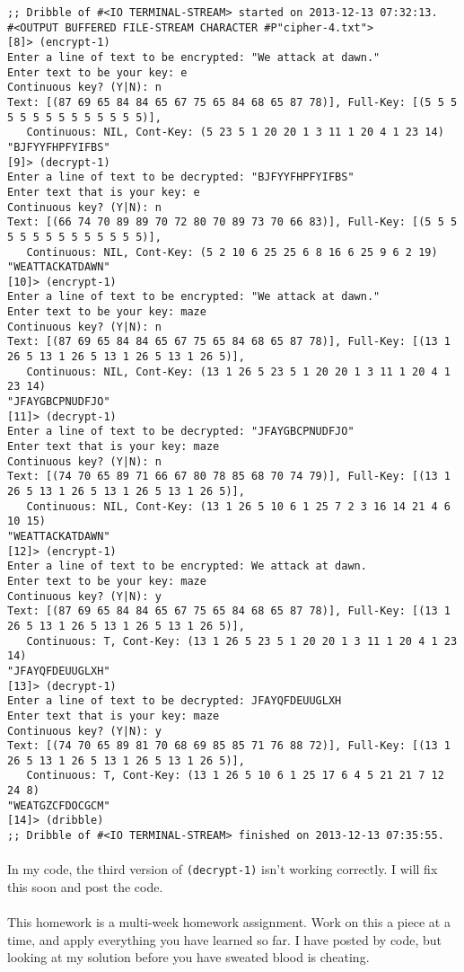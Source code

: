 \documentclass{article}
\begin{document}
\begin{verbatim}
;; Dribble of #<IO TERMINAL-STREAM> started on 2013-12-13 07:32:13.
#<OUTPUT BUFFERED FILE-STREAM CHARACTER #P"cipher-4.txt">
[8]> (encrypt-1)
Enter a line of text to be encrypted: "We attack at dawn."
Enter text to be your key: e
Continuous key? (Y|N): n
Text: [(87 69 65 84 84 65 67 75 65 84 68 65 87 78)], Full-Key: [(5 5 5 5 5 5 5 5 5 5 5 5 5 5)],
   Continuous: NIL, Cont-Key: (5 23 5 1 20 20 1 3 11 1 20 4 1 23 14)
"BJFYYFHPFYIFBS"
[9]> (decrypt-1)
Enter a line of text to be decrypted: "BJFYYFHPFYIFBS"
Enter text that is your key: e
Continuous key? (Y|N): n
Text: [(66 74 70 89 89 70 72 80 70 89 73 70 66 83)], Full-Key: [(5 5 5 5 5 5 5 5 5 5 5 5 5 5)],
   Continuous: NIL, Cont-Key: (5 2 10 6 25 25 6 8 16 6 25 9 6 2 19)
"WEATTACKATDAWN"
[10]> (encrypt-1)
Enter a line of text to be encrypted: "We attack at dawn."
Enter text to be your key: maze
Continuous key? (Y|N): n
Text: [(87 69 65 84 84 65 67 75 65 84 68 65 87 78)], Full-Key: [(13 1 26 5 13 1 26 5 13 1 26 5 13 1 26 5)], 
   Continuous: NIL, Cont-Key: (13 1 26 5 23 5 1 20 20 1 3 11 1 20 4 1 23 14)
"JFAYGBCPNUDFJO"
[11]> (decrypt-1)
Enter a line of text to be decrypted: "JFAYGBCPNUDFJO"
Enter text that is your key: maze
Continuous key? (Y|N): n
Text: [(74 70 65 89 71 66 67 80 78 85 68 70 74 79)], Full-Key: [(13 1 26 5 13 1 26 5 13 1 26 5 13 1 26 5)], 
   Continuous: NIL, Cont-Key: (13 1 26 5 10 6 1 25 7 2 3 16 14 21 4 6 10 15)
"WEATTACKATDAWN"
[12]> (encrypt-1)
Enter a line of text to be encrypted: We attack at dawn.
Enter text to be your key: maze
Continuous key? (Y|N): y
Text: [(87 69 65 84 84 65 67 75 65 84 68 65 87 78)], Full-Key: [(13 1 26 5 13 1 26 5 13 1 26 5 13 1 26 5)], 
   Continuous: T, Cont-Key: (13 1 26 5 23 5 1 20 20 1 3 11 1 20 4 1 23 14)
"JFAYQFDEUUGLXH"
[13]> (decrypt-1)
Enter a line of text to be decrypted: JFAYQFDEUUGLXH
Enter text that is your key: maze
Continuous key? (Y|N): y
Text: [(74 70 65 89 81 70 68 69 85 85 71 76 88 72)], Full-Key: [(13 1 26 5 13 1 26 5 13 1 26 5 13 1 26 5)], 
   Continuous: T, Cont-Key: (13 1 26 5 10 6 1 25 17 6 4 5 21 21 7 12 24 8)
"WEATGZCFDOCGCM"
[14]> (dribble)
;; Dribble of #<IO TERMINAL-STREAM> finished on 2013-12-13 07:35:55.
\end{verbatim}

\paragraph{}In my code, the third version of \texttt{(decrypt-1)} isn't working correctly. I will fix this soon and post the code.

\paragraph{}This homework is a multi-week homework assignment. Work on this a piece at a time, and apply everything you have learned so far. I have posted by code, but looking at my solution before you have sweated blood is cheating.
\end{document}
